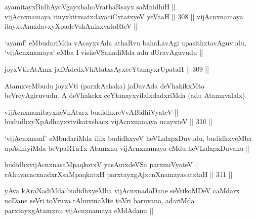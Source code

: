 
\begin{shl}
ayamitayxBidhAyoVgayxbahoVrathaRsayx saMnidhiH || \\
vijAcnxnamaya ituyxkitxsatxdavaciCxtatxyeV yeVtaH ||  308 ||  
vijAcnxnamaya itayxsAmxdavxyXpadeVshAninxvataRteV || \\
\end{shl}

\begin{artha}
`ayamf' eMbudariMda vAcayxvAda athaRvu bahaLavAgi upasithxtavAguvudu, `vijAcnxnamaya' eMba I visheVSanadiMda adu dUravAguvudu ||
\end{artha}

\begin{shl}
joyxVtirAtAmx jaDAdedxVhAtatxsAyxceYtanayxrUpataH ||  309 ||  
\end{shl}

\begin{artha}
AtamxveMbudu joyxVti (parxkAshaka) jaDavAda deVhakikxMta beVreyAgiruvudu. A deVhakekx ceYtanayxvilalxdadxriMda (adu Atamxvalalx)
\end{artha}


\begin{shl}
vijAcnxnamitayxneVnAtarx budidhxreVvABidhiVyateV || \\
bududhxyXpAdhayxvivikatxshacx vijAcnxnamaya ucayxteV ||  310 || 
\end{shl}	

\begin{artha}
`vijAcnxnamf' eMbudariMda ililx budidhxyeV heVLalapxDuvudu, budidhxyeMba upAdhiyiMda beVpaRTaTx Atamxnu vijAcnxnamaya eMdu heVLalapxDuvanu ||
\end{artha}


\begin{shl}
budidhxvijAcnxnasaMpaqkotxV yasAmxdeVSa parxmiVyateV || \\
rAhuvacacxnadxrXsaMpaqkatxH parxtayxgAjxcnXnamayasatxtaH ||  311 ||  
\end{shl}

\begin{artha}
yAva kAraNadiMda budidhxyeMba vijAcnxnadoDane seVrikoMDeV caMdarx noDane seVri toVruva rAhuvinaMte toVri baruvano, adariMda parxtayxgAtamxnu vijAcnxnamaya eMdAdanu ||
\end{artha}

